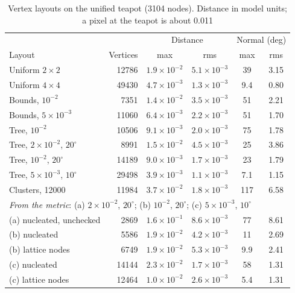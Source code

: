 \documentclass[journal]{IEEEtran}
\begin{document}
\begin{table}[H]
\caption{Vertex layouts on the unified teapot (3104 nodes). Distance in
model units; a pixel at the teapot is about 0.011}
\label{tab:layouts}
\centering
\scriptsize
\setlength{\tabcolsep}{2.6pt}
\begin{tabular}{l|r|cc|cc}
\hline
 & & \multicolumn{2}{c|}{Distance} & \multicolumn{2}{c}{Normal (deg)}\\
Layout & Vertices & max & rms & max & rms\\
\hline
Uniform $2\times2$ & 12786 & $1.9\times10^{-2}$ & $5.1\times10^{-3}$ & 39 & 3.15\\
Uniform $4\times4$ & 49430 & $4.7\times10^{-3}$ & $1.3\times10^{-3}$ & 9.4 & 0.80\\
Bounds, $10^{-2}$ & 7351 & $1.4\times10^{-2}$ & $3.5\times10^{-3}$ & 51 & 2.21\\
Bounds, $5\times10^{-3}$ & 11060 & $6.4\times10^{-3}$ & $2.2\times10^{-3}$ & 51 & 1.70\\
Tree, $10^{-2}$ & 10506 & $9.1\times10^{-3}$ & $2.0\times10^{-3}$ & 75 & 1.78\\
Tree, $2\times10^{-2}$, $20^\circ$ & 8991 & $1.5\times10^{-2}$ & $4.5\times10^{-3}$ & 25 & 3.86\\
Tree, $10^{-2}$, $20^\circ$ & 14189 & $9.0\times10^{-3}$ & $1.7\times10^{-3}$ & 23 & 1.79\\
Tree, $5\times10^{-3}$, $10^\circ$ & 29498 & $3.9\times10^{-3}$ & $1.1\times10^{-3}$ & 7.1 & 1.15\\
Clusters, 12000 & 11984 & $3.7\times10^{-2}$ & $1.8\times10^{-3}$ & 117 & 6.58\\
\hline
\multicolumn{6}{l}{\emph{From the metric}: (a) $2\times10^{-2}$, $20^\circ$; (b) $10^{-2}$, $20^\circ$; (c) $5\times10^{-3}$, $10^\circ$}\\
(a) nucleated, unchecked & 2869 & $1.6\times10^{-1}$ & $8.6\times10^{-3}$ & 77 & 8.61\\
(b) nucleated & 5586 & $1.9\times10^{-2}$ & $4.2\times10^{-3}$ & 11 & 2.69\\
(b) lattice nodes & 6749 & $1.9\times10^{-2}$ & $5.3\times10^{-3}$ & 9.9 & 2.41\\
(c) nucleated & 14144 & $2.3\times10^{-2}$ & $1.7\times10^{-3}$ & 58 & 1.31\\
(c) lattice nodes & 12464 & $1.0\times10^{-2}$ & $2.6\times10^{-3}$ & 5.4 & 1.31\\
\hline
\end{tabular}
\end{table}
\end{document}
